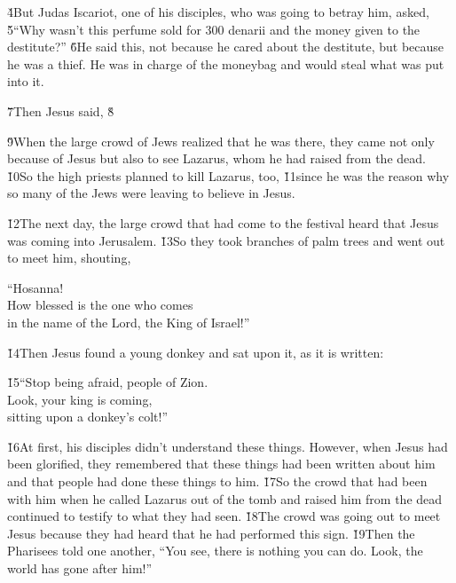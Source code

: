\v{4}But Judas Iscariot, one of his disciples, who was going to betray him, asked, \v{5}``Why wasn't this perfume sold for 300 denarii and the money given to the destitute?'' \v{6}He said this, not because he cared about the destitute, but because he was a thief. He was in charge of the moneybag and would steal what was put into it.

\v{7}Then Jesus said,  \v{8}

\v{9}When the large crowd of Jews realized that he was there, they came not only because of Jesus but also to see Lazarus, whom he had raised from the dead. \v{10}So the high priests planned to kill Lazarus, too, \v{11}since he was the reason why so many of the Jews were leaving to believe in Jesus.

\v{12}The next day, the large crowd that had come to the festival heard that Jesus was coming into Jerusalem. \v{13}So they took branches of palm trees and went out to meet him, shouting,

\begin{poetry}
\poeml ``Hosanna! \\
\poeml How blessed is the one who comes \\
\poemll    in the name of the Lord, the King of Israel!''
\end{poetry}

\v{14}Then Jesus found a young donkey and sat upon it, as it is written:

\begin{poetry}
\poeml \v{15}``Stop being afraid, people of Zion. \\
\poeml Look, your king is coming, \\
\poemll    sitting upon a donkey's colt!''
\end{poetry}

\v{16}At first, his disciples didn't understand these things. However, when Jesus had been glorified, they remembered that these things had been written about him and that people had done these things to him. \v{17}So the crowd that had been with him when he called Lazarus out of the tomb and raised him from the dead continued to testify to what they had seen. \v{18}The crowd was going out to meet Jesus because they had heard that he had performed this sign. \v{19}Then the Pharisees told one another, ``You see, there is nothing you can do. Look, the world has gone after him!''


